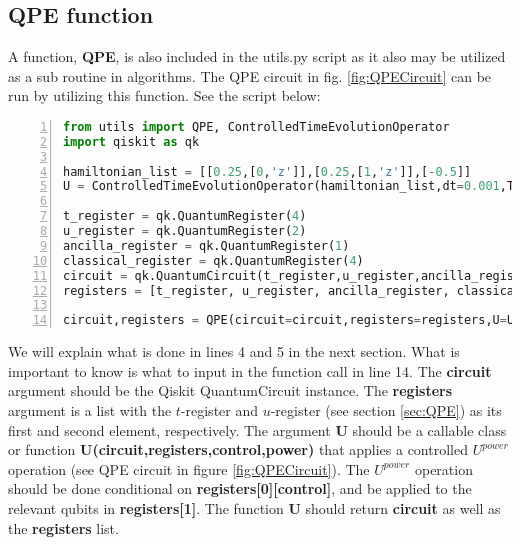 \subsection{QPE function}
\label{subsec:MethodsQPEFunction}
A function, \textbf{QPE}, is also included in the utils.py script as it also may be utilized as a sub routine in algorithms. The QPE circuit in fig. \ref{fig:QPECircuit} can be run by utilizing this function. See the script below:
\begin{lstlisting}[language=Python,numbers=left]
from utils import QPE, ControlledTimeEvolutionOperator
import qiskit as qk 

hamiltonian_list = [[0.25,[0,'z']],[0.25,[1,'z']],[-0.5]]
U = ControlledTimeEvolutionOperator(hamiltonian_list,dt=0.001,T=1)

t_register = qk.QuantumRegister(4)
u_register = qk.QuantumRegister(2)
ancilla_register = qk.QuantumRegister(1)
classical_register = qk.QuantumRegister(4)
circuit = qk.QuantumCircuit(t_register,u_register,ancilla_register,classical_register)
registers = [t_register, u_register, ancilla_register, classical_register]

circuit,registers = QPE(circuit=circuit,registers=registers,U=U)
\end{lstlisting}
We will explain what is done in lines 4 and 5 in the next section. What is important to know is what to input in the function call in line 14. The \textbf{circuit} argument should be the Qiskit QuantumCircuit instance. The \textbf{registers} argument is a list with the $t$-register and $u$-register (see section \ref{sec:QPE}) as its first and second element, respectively. The argument \textbf{U} should be a callable class or function \textbf{U(circuit,registers,control,power)} that applies a controlled $U^{power}$ operation (see QPE circuit in figure \ref{fig:QPECircuit}). The $U^{power}$ operation should be done conditional on \textbf{registers[0][control]}, and be applied to the relevant qubits in \textbf{registers[1]}. The function \textbf{U} should return \textbf{circuit} as well as the \textbf{registers} list. 


